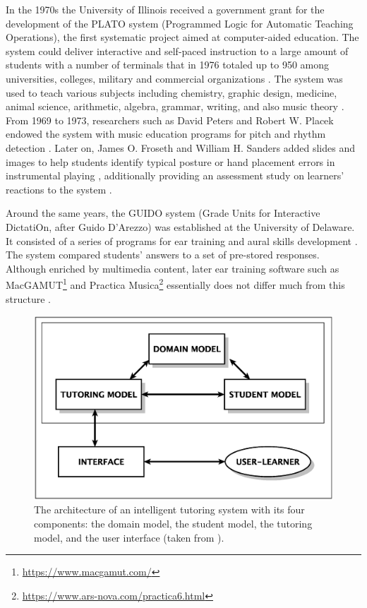 \documentclass[journal]{IEEEtran}
\begin{document}
In the 1970s the University of Illinois received a government grant for the development of the PLATO system (Programmed Logic for Automatic Teaching Operations), the first systematic project aimed at computer-aided education.  The system could deliver interactive and self-paced instruction to a large amount of students with a number of terminals that in 1976 totaled up to 950 among universities, colleges, military and commercial organizations \cite{smith1976educational}. The system was used to teach various subjects including chemistry, graphic design, medicine, animal science, arithmetic, algebra, grammar, writing, and also music theory \cite{hofstetter1981computer}. From 1969 to 1973, researchers such as David Peters and Robert W. Placek endowed the system with music education programs for pitch and rhythm detection \cite{peters1974, placek1973}. Later on, James O. Froseth and William H. Sanders added slides and images to help students identify typical posture or hand placement errors in instrumental playing \cite{froseth2004}, additionally providing an assessment study on learners' reactions to the system \cite{sanders1979}. 

Around the same years, the GUIDO system (Grade Units for Interactive DictatiOn, after Guido D'Arezzo) was established at the University of Delaware. It consisted of a series of programs for ear training and aural skills development \cite{hofstetter1975guido,eddins1981brief}. The system compared students' answers to a set of pre-stored responses. 
Although enriched by multimedia content, later ear training software such as MacGAMUT\footnote{\url{https://www.macgamut.com/}} and Practica Musica\footnote{\url{https://www.ars-nova.com/practica6.html}} essentially does not differ much from this structure \cite{brandao1999computers}. 

\begin{figure}[t]
	\centering
	\includegraphics[scale=.3]{images/ITS.eps}
	\caption{The architecture of an intelligent tutoring system with its four components: the domain model, the student model, the tutoring model, and the user interface (taken from \cite{nkambou2010advances}).}
	\label{fig:ITS}       
\end{figure}
\end{document}
